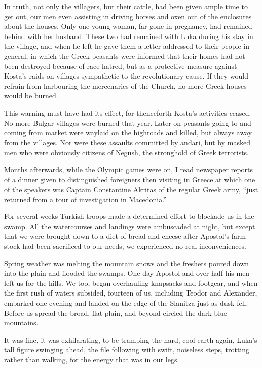 \documentclass[a5paper,12pt]{book}
\begin{document}
In truth, not only the villagers, but their cattle, had been given ample time to get out, our men even assisting in driving horses and oxen out of the enclosures about the houses. Only one young woman, far gone in pregnancy, had remained behind with her husband. These two had remained with Luka during his stay in the village, and when he left he gave them a letter addressed to their people in general, in which the Greek peasants were informed that their homes had not been destroyed because of race hatred, but as a protective measure against Kosta’s raids on villages sympathetic to the revolutionary cause. If they would refrain from harbouring the mercenaries of the Church, no more Greek houses would be burned.

This warning must have had its effect, for thenceforth Kosta’s activities ceased. No more Bulgar villages were burned that year. Later on peasants going to and coming from market were waylaid on the highroads and killed, but always away from the villages. Nor were these assaults committed by andari, but by masked men who were obviously citizens of Negush, the stronghold of Greek terrorists.

Months afterwards, while the Olympic games were on, I read newspaper reports of a dinner given to distinguished foreigners then visiting in Greece at which one of the speakers was Captain Constantine Akritas of the regular Greek army, “just returned from a tour of investigation in Macedonia.”

For several weeks Turkish troops made a determined effort to blockade us in the swamp. All the watercourses and landings were ambuscaded at night, but except that we were brought down to a diet of bread and cheese after Apostol’s farm stock had been sacrificed to our needs, we experienced no real inconveniences.

Spring weather was melting the mountain snows and the freshets poured down into the plain and flooded the swamps. One day Apostol and over half his men left us for the hills. We too, began overhauling knapsacks and footgear, and when the first rush of waters subsided, fourteen of us, including Teodor and Alexander, embarked one evening and landed on the edge of the Slanitza just as dusk fell. Before us spread the broad, flat plain, and beyond circled the dark blue mountains.

It was fine, it was exhilarating, to be tramping the hard, cool earth again, Luka’s tall figure swinging ahead, the file following with swift, noiseless steps, trotting rather than walking, for the energy that was in our legs.
\end{document}
